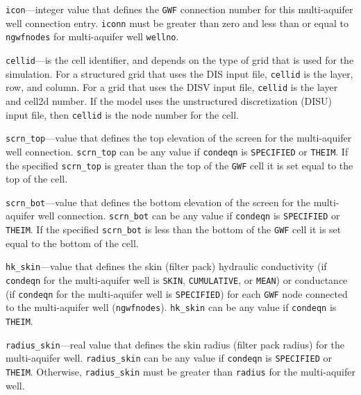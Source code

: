 \item \texttt{icon}---integer value that defines the \texttt{GWF} connection number for this multi-aquifer well connection entry. \texttt{iconn} must be greater than zero and less than or equal to \texttt{ngwfnodes} for multi-aquifer well \texttt{wellno}.

\item \texttt{cellid}---is the cell identifier, and depends on the type of grid that is used for the simulation.  For a structured grid that uses the DIS input file, \texttt{cellid} is the layer, row, and column.   For a grid that uses the DISV input file, \texttt{cellid} is the layer and cell2d number.  If the model uses the unstructured discretization (DISU) input file, then \texttt{cellid} is the node number for the cell.

\item \texttt{scrn\_top}---value that defines the top elevation of the screen for the multi-aquifer well connection.  \texttt{scrn\_top} can be any value if \texttt{condeqn} is \texttt{SPECIFIED} or \texttt{THEIM}. If the specified \texttt{scrn\_top} is greater than the top of the \texttt{GWF} cell it is set equal to the top of the cell.

\item \texttt{scrn\_bot}---value that defines the bottom elevation of the screen for the multi-aquifer well connection.  \texttt{scrn\_bot} can be any value if \texttt{condeqn} is \texttt{SPECIFIED} or \texttt{THEIM}. If the specified \texttt{scrn\_bot} is less than the bottom of the \texttt{GWF} cell it is set equal to the bottom of the cell.

\item \texttt{hk\_skin}---value that defines the skin (filter pack) hydraulic conductivity (if \texttt{condeqn} for the multi-aquifer well is \texttt{SKIN}, \texttt{CUMULATIVE}, or \texttt{MEAN}) or conductance (if \texttt{condeqn} for the multi-aquifer well is \texttt{SPECIFIED}) for each \texttt{GWF} node connected to the multi-aquifer well (\texttt{ngwfnodes}). \texttt{hk\_skin} can be any value if \texttt{condeqn} is \texttt{THEIM}.

\item \texttt{radius\_skin}---real value that defines the skin radius (filter pack radius) for the multi-aquifer well. \texttt{radius\_skin} can be any value if \texttt{condeqn} is \texttt{SPECIFIED} or \texttt{THEIM}. Otherwise, \texttt{radius\_skin} must be greater than \texttt{radius} for the multi-aquifer well.

